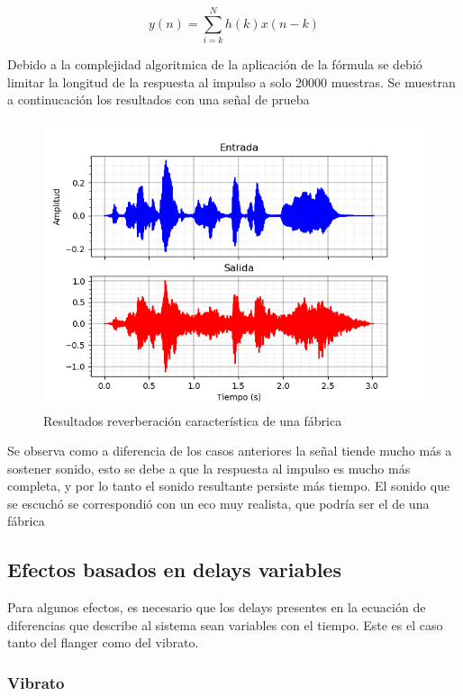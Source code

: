 \documentclass[assd_tp2_main.tex]{subfiles}
\begin{document}
\begin{equation}
y(n)=\sum_{i=k}^{N}h(k)x(n-k)
\end{equation}

Debido a la complejidad algoritmica de la aplicación de la fórmula se debió limitar la longitud de la respuesta al impulso a solo 20000 muestras. Se muestran a continucación los resultados con una señal de prueba

\begin{figure}[H]	
	\centering
	\includegraphics[scale=1]{graficos/EJ8/eco_convolucion.png}
	\caption{Resultados reverberación característica de una fábrica}
	\label{fig:bloqueElemental}
\end{figure}

Se observa como a diferencia de los casos anteriores la señal tiende mucho más a sostener sonido, esto se debe a que la respuesta al impulso es mucho más completa, y por lo tanto el sonido resultante persiste más tiempo.
El sonido que se escuchó se correspondió con un eco muy realista, que podría ser el de una fábrica


\subsection{Efectos basados en delays variables} 

Para algunos efectos, es necesario que los delays presentes en la ecuaci\'on de diferencias que describe al sistema sean variables con el tiempo. Este es el caso tanto del flanger como del vibrato.


\subsubsection{Vibrato}
\end{document}
